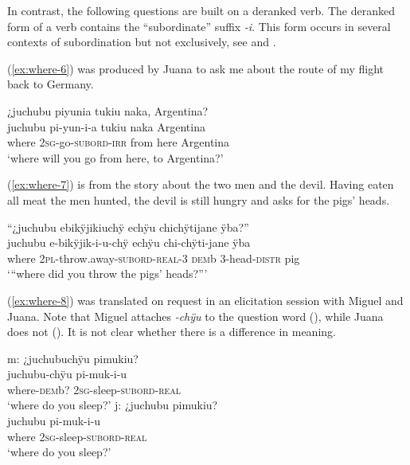 In contrast, the following questions are built on a deranked verb. The deranked form of a verb contains the “subordinate” suffix \textit{-i}. This form occurs in several contexts of subordination but not exclusively, see  and .

(\ref{ex:where-6}) was produced by Juana to ask me about the route of my flight back to Germany.

\ea\label{ex:where-6}
\begingl
\glpreamble ¿juchubu piyunia tukiu naka, Argentina?\\
\gla juchubu pi-yun-i-a tukiu naka Argentina\\
\glb where 2\textsc{sg}-go-\textsc{subord}-\textsc{irr} from here Argentina\\
\glft ‘where will you go from here, to Argentina?’
\endgl
\trailingcitation{[jxx-e120516l-1.111]}
\xe

(\ref{ex:where-7}) is from the story about the two men and the devil. Having eaten all meat the men hunted, the devil is still hungry and asks for the pigs’ heads.

\ea\label{ex:where-7}
\begingl
\glpreamble “¿juchubu ebikÿjikiuchÿ echÿu chichÿtijane ÿba?”\\
\gla juchubu e-bikÿjik-i-u-chÿ echÿu chi-chÿti-jane ÿba\\
\glb where 2\textsc{pl}-throw.away-\textsc{subord}-\textsc{real}-3 \textsc{dem}b 3-head-\textsc{distr} pig\\
\glft ‘“where did you throw the pigs’ heads?”’
\endgl
\trailingcitation{[mxx-n101017s-1.046-048]}
\xe

(\ref{ex:where-8}) was translated on request in an elicitation session with Miguel and Juana. Note that Miguel attaches \textit{-chÿu} to the question word (), while Juana does not (). It is not clear whether there is a difference in meaning.

\ea\label{ex:where-8}
  \ea\label{ex:where-8.1}
\begingl
\glpreamble \textup{m:} ¿juchubuchÿu pimukiu?\\
\gla juchubu-chÿu pi-muk-i-u\\
\glb where-\textsc{dem}b? 2\textsc{sg}-sleep-\textsc{subord}-\textsc{real}\\
\glft ‘where do you sleep?’
\endgl
  \ex\label{ex:where-8.2}
\begingl
\glpreamble \textup{j:} ¿juchubu pimukiu? \\
\gla juchubu pi-muk-i-u\\
\glb where 2\textsc{sg}-sleep-\textsc{subord}-\textsc{real}\\
\glft ‘where do you sleep?’
\endgl
\trailingcitation{[jmx-e090727s.362-363]}
\z
\xe

